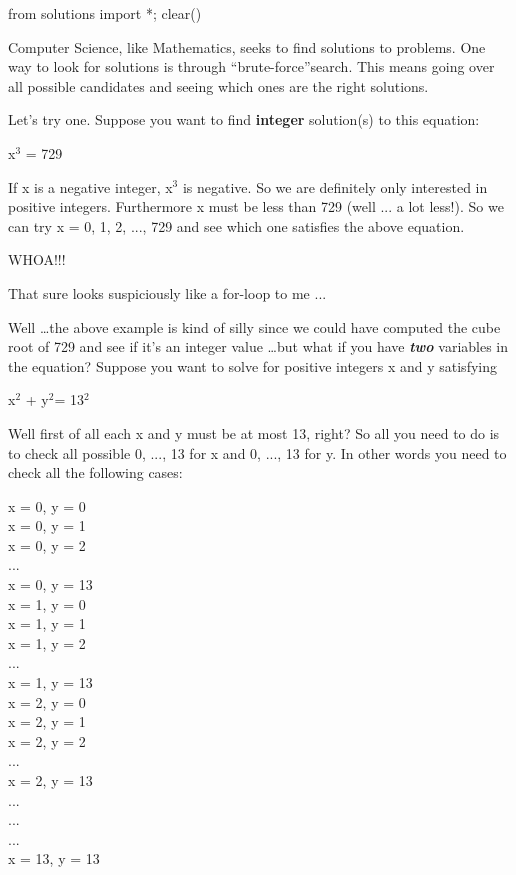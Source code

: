 \begin{python0}
from solutions import *; clear()
\end{python0}

Computer Science, like Mathematics, seeks to find solutions to problems.
One way to look for solutions is through ``brute-force''search. This
means going over all possible candidates and seeing which ones are the
right solutions.

Let's try one. Suppose you want to find \textbf{integer} solution(s) to this equation:
\begin{center}
x$^{3}$ = 729
\end{center}
If x is a negative integer, x$^{3}$ is negative. So we are definitely only interested in positive integers. Furthermore x must be less than 729 (well ... a lot less!). So we can try x = 0, 1, 2, ..., 729 and see which one satisfies the above equation.

WHOA!!!

That sure looks suspiciously like a for-loop to me ...

Well \ldots the above example is kind of silly since we could have
computed the cube root of 729 and see if it's an integer
value \ldots but what if you have \textit{\textbf{two}} variables in the
equation? Suppose you want to solve for positive integers x and y
satisfying

\begin{center}
x$^{2}$ + y$^{2}$= 13$^{2}$
\end{center}

Well first of all each x and y must be at most 13, right? So all you
need to do is to check all possible 0, ..., 13 for x and 0, ..., 13 for
y. In other words you need to check all the following cases:

x = 0, y = 0\\
x = 0, y = 1\\
x = 0, y = 2\\
...\\
x = 0, y = 13\\
x = 1, y = 0\\
x = 1, y = 1\\
x = 1, y = 2\\
...\\
x = 1, y = 13\\
x = 2, y = 0\\
x = 2, y = 1\\
x = 2, y = 2\\
...\\
x = 2, y = 13\\
...\\
...\\
...\\
x = 13, y = 13\\

